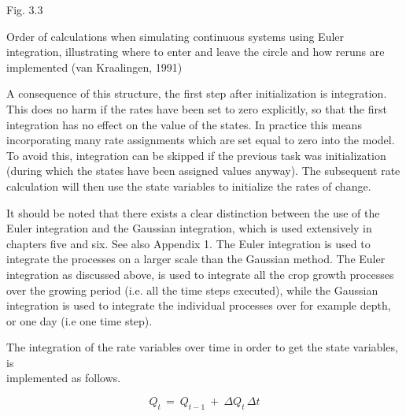 \begin{figure}[htbp]
 \begin{center} \end{center}
\end{figure}

\bigskip
\bigskip
\bigskip
\bigskip
\bigskip
\bigskip
\bigskip
\bigskip
\bigskip
\bigskip
\bigskip
\bigskip
\bigskip
\bigskip
\bigskip
\bigskip
\bigskip
\bigskip
\bigskip
\bigskip
Fig. 3.3 
\testlastline

\begin{indenting}{2.54cm}
Order of cal\-cu\-la\-tions when simulating continuous systems using Euler
integra\-tion, illustrating where to enter and leave the circle and how reruns
are implemented (van Kraalingen, 1991)
\end{indenting}

\bigskip
\bigskip
A consequence of this structure, the first step after initialization is integration. This does
no harm if the rates have been set to zero explicitly, so that the first integration has no
effect on the value of the states. In practice this means incorporat\-ing many rate assign\-ments which are set equal to zero into the model. To avoid this, integration can be
skipped if the previous task was initialization (during which the states have been assigned
values anyway). The subsequent rate calculation will then use the state variables to
initialize the rates of change.

\bigskip
\bigskip
\bigskip
\bigskip
\bigskip
It should be noted that there exists a clear distinction between the use of the Euler
integration and the Gaussian integration, which is used extensively in chapters five and
six. See also Appendix 1. The Euler integration is used to integrate the process\-es on a
larger scale than the Gaussian method. The Euler integration as discussed above, is used
to integrate all the crop growth processes over the growing period (i.e. all the time steps
executed), while the Gaussian integration is used to integrate the individual processes over
for example depth, or one day (i.e one time step). 

The integration of the rate variables over time in order to get the state variables, is \\
implemented as follows.


\begin{displaymath}
Q _{t~} =~Q _{t-1} ~+~\Delta Q _{t} \,\Delta t
\end{displaymath}

